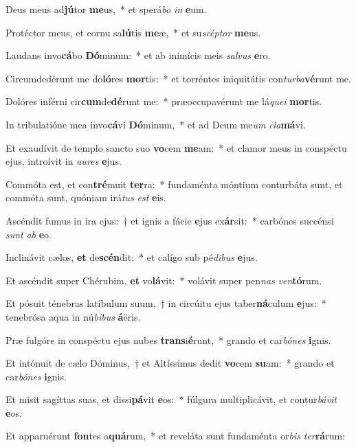 \item Deus meus ad\textbf{jú}tor \textbf{me}us,~* et sperá\textit{bo} \textit{in} \textbf{e}um.
\item Protéctor meus, et cornu sa\textbf{lú}tis \textbf{me}æ,~* et su\textit{scép}\textit{tor} \textbf{me}us.
\item Laudans invo\textbf{cá}bo \textbf{Dó}minum:~* et ab inimícis meis \textit{sal}\textit{vus} \textbf{e}ro.
\item Circumdedérunt me do\textbf{ló}res \textbf{mor}tis:~* et torréntes iniquitátis con\textit{tur}\textit{ba}\textbf{vé}runt me.
\item Dolóres inférni cir\textbf{cum}de\textbf{dé}runt me:~* præoccupavérunt me lá\textit{que}\textit{i} \textbf{mor}tis.
\item In tribulatióne mea invo\textbf{cá}vi \textbf{Dó}minum,~* et ad Deum me\textit{um} \textit{cla}\textbf{má}vi.
\item Et exaudívit de templo sancto suo \textbf{vo}cem \textbf{me}am:~* et clamor meus in conspéctu ejus, introívit in \textit{au}\textit{res} \textbf{e}jus.
\item Commóta est, et con\textbf{tré}muit \textbf{ter}ra:~* fundaménta móntium conturbáta sunt, et commóta sunt, quóniam irá\textit{tus} \textit{est} \textbf{e}is.
\item Ascéndit fumus in ira ejus:~† et ignis a fácie \textbf{e}jus ex\textbf{ár}sit:~* carbónes succénsi \textit{sunt} \textit{ab} \textbf{e}o.
\item Inclinávit cælos, \textbf{et} de\textbf{scén}dit:~* et calígo sub pé\textit{di}\textit{bus} \textbf{e}jus.
\item Et ascéndit super Chérubim, \textbf{et} vo\textbf{lá}vit:~* volávit super pen\textit{nas} \textit{ven}\textbf{tó}rum.
\item Et pósuit ténebras latíbulum suum,~† in circúitu ejus taber\textbf{ná}culum \textbf{e}jus:~* tenebrósa aqua in nú\textit{bi}\textit{bus} \textbf{á}ëris.
\item Præ fulgóre in conspéctu ejus nubes \textbf{trans}i\textbf{é}runt,~* grando et car\textit{bó}\textit{nes} \textbf{i}gnis.
\item Et intónuit de cælo Dóminus,~† et Altíssimus dedit \textbf{vo}cem \textbf{su}am:~* grando et car\textit{bó}\textit{nes} \textbf{i}gnis.
\item Et misit sagíttas suas, et dissi\textbf{pá}vit \textbf{e}os:~* fúlgura multiplicávit, et contur\textit{bá}\textit{vit} \textbf{e}os.
\item Et apparuérunt \textbf{fon}tes a\textbf{quá}rum,~* et reveláta sunt fundaménta or\textit{bis} \textit{ter}\textbf{rá}rum:
